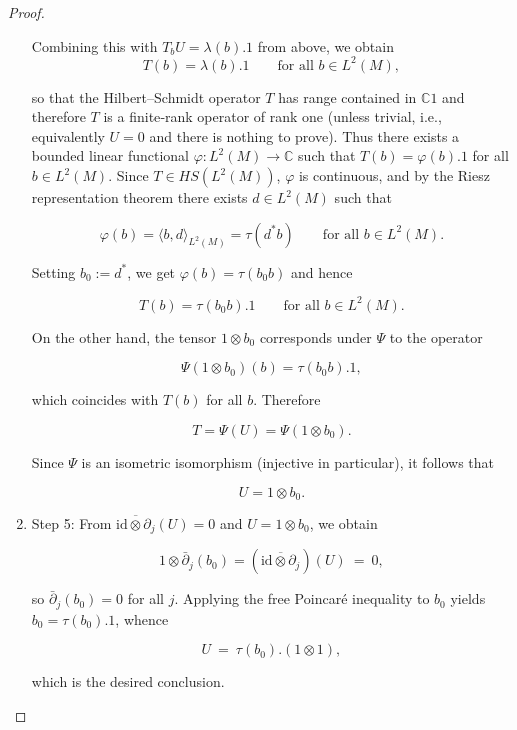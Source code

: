 \documentclass[10pt,a4paper,reqno]{amsart}
\def\qed{ \hfill \vrule width.25cm height.25cm depth0cm\smallskip}
\newcommand{\C}{\mathbb{C}}
\begin{document}
\begin{proof}
\begin{enumerate}
  Combining this with $T_b U=\lambda(b).1$ from above, we obtain
\[
    T(b) = \lambda(b).1\qquad\text{for all }b\in L^2(M),
  \]


  so that the Hilbert–Schmidt operator $T$
 has range contained in $\mathbb C1$
and therefore $T$ is a finite‑rank operator of rank one (unless trivial, i.e., equivalently $U=0$ and there is nothing to prove). Thus there exists a bounded linear functional $\varphi:L^2(M)\to\C$ such that $
    T(b) = \varphi(b).1$ {for all }$b\in L^2(M)$. Since $T\in HS(L^2(M))$, $\varphi$ is continuous, and by the Riesz representation theorem there exists $d\in L^2(M)$ such that
  

\[
    \varphi(b)=\langle b,d\rangle_{L^2(M)}=\tau(d^\ast b)\qquad\text{for all }b\in L^2(M).
  \]


  Setting $b_0:=d^\ast$, we get $\varphi(b)=\tau(b_0 b)$ and hence
  

\[
    T(b) = \tau(b_0 b).1\qquad\text{for all }b\in L^2(M).
  \]



  On the other hand, the tensor $1\otimes b_0$ corresponds under $\Psi$ to the operator
  

\[
    \Psi(1\otimes b_0)(b) = \tau(b_0 b).1,
  \]


  which coincides with $T(b)$ for all $b$. Therefore
  

\[
    T = \Psi(U) = \Psi(1\otimes b_0).
  \]


  Since $\Psi$ is an isometric isomorphism (injective in particular), it follows that
  

\[
    U = 1\otimes b_0.
  \]



  \item Step 5: From $\overline{\mathrm{id}\otimes \partial_j}(U)=0$ and $U=1\otimes b_0$, we obtain
  

\[
  1\otimes \bar\partial_j(b_0) =(\overline{\mathrm{id}\otimes \partial_j})(U)\ =\ 0,
  \]


  so $\bar\partial_j(b_0)=0$ for all $j$.  
  Applying the free Poincaré inequality to $b_0$ yields $b_0=\tau(b_0).1$, whence
  

\[
  U\ =\ \tau(b_0).(1\otimes 1),
  \]


  which is the desired conclusion.

\end{enumerate}
\end{proof}
\qed
\end{document}
